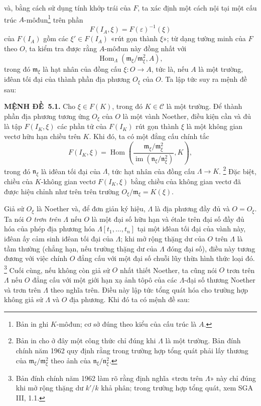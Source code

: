 \documentclass[11pt,twoside,openany]{book}
\numberwithin{equation}{section}
\newcommand{\src}[1]{%
  \phantomsection\hypertarget{src:\fgasourceid:#1}{}%
  \marginpar{\raggedleft\footnotesize\sffamily #1}%
}
\newcommand{\fgasourceid}{unset}
\newcommand{\result}[2]{\par\medskip\noindent\textbf{#1\if\relax\detokenize{#2}\relax\else\ #2\fi.}\quad}
\begin{document}
\src{376}
và, bằng cách sử dụng tính khớp trái của $F$, ta xác định một cách nội tại
một cấu trúc $A$-môđun\footnote{Bản in ghi $K$-môđun; cơ sở đúng theo kiểu
của cấu trúc là $A$.} trên phần
\[
  F(I_A,\xi)=F(\varepsilon)^{-1}(\xi)
\]
của $F(I_A)$ gồm các $\xi'\in F(I_A)$ «rút gọn thành $\xi$»; từ dạng tường
minh của $F$ theo $O$, ta kiểm tra được rằng $A$-môđun này đồng nhất với
\[
  \operatorname{Hom}_{\Lambda}(\mathfrak m_\xi/\mathfrak m_\xi^2,A),
\]
trong đó $\mathfrak m_\xi$ là hạt nhân của đồng cấu
$\xi:O\longrightarrow A$, tức là, nếu $A$ là một trường, iđêan tối đại của
thành phần địa phương $O_\xi$ của $O$. Ta lập tức suy ra mệnh đề sau:

\result{MỆNH ĐỀ}{5.1} Cho $\xi\in F(K)$, trong đó $K\in\mathcal C$ là một
trường. Để thành phần địa phương tương ứng $O_\xi$ của $O$ là một vành
Noether, điều kiện cần và đủ là tập $F(I_K,\xi)$ các phần tử của $F(I_K)$ rút
gọn thành $\xi$ là một không gian vectơ hữu hạn chiều trên $K$. Khi đó, ta có
một đẳng cấu chính tắc
\[
  F(I_K,\xi)=
  \operatorname{Hom}\!\left(
    \frac{\mathfrak m_\xi/\mathfrak m_\xi^2}
         {\operatorname{im}(\mathfrak n_\xi/\mathfrak n_\xi^2)},K
  \right),
\]
trong đó $\mathfrak n_\xi$ là iđêan tối đại của $\Lambda$, tức hạt nhân của
đồng cấu $\Lambda\longrightarrow K$.
\footnote{Bản in cho ở đây một công thức chỉ đúng khi $\Lambda$ là một
trường. Bản đính chính năm 1962 quy định rằng trong trường hợp tổng quát phải
lấy thương của $\mathfrak m_\xi/\mathfrak m_\xi^2$ theo ảnh của
$\mathfrak n_\xi/\mathfrak n_\xi^2$.}
Đặc biệt, chiều của $K$-không gian vectơ $F(I_K,\xi)$ bằng chiều của không
gian vectơ đã được hiệu chỉnh như trên trên trường
$O_\xi/\mathfrak m_\xi=K(\xi)$.

Giả sử $O_\xi$ là Noether và, để đơn giản ký hiệu, $\Lambda$ là địa phương
đầy đủ và $O=O_\xi$. Ta nói $O$ \emph{trơn trên $\Lambda$} nếu $O$ là một
đại số hữu hạn và étale trên đại số đầy đủ hóa của phép địa phương hóa
$\Lambda[t_1,\ldots,t_n]$ tại một iđêan tối đại của vành này, iđêan ấy cảm
sinh iđêan tối đại của $\Lambda$; khi mở rộng thặng dư của $O$ trên
$\Lambda$ là tầm thường (chẳng hạn, nếu trường thặng dư của $\Lambda$ đóng
đại số), điều này tương đương với việc chính $O$ đẳng cấu với một đại số
chuỗi lũy thừa hình thức loại đó.
\footnote{Bản đính chính năm 1962 làm rõ rằng định nghĩa «trơn trên
$\Lambda$» này chỉ đúng khi mở rộng thặng dư $k'/k$ khả phân; trong trường
hợp tổng quát, xem SGA III, 1.1.}
Cuối cùng, nếu không còn giả sử $O$ nhất thiết Noether, ta cũng nói $O$ trơn
trên $\Lambda$ nếu $O$ đẳng cấu với một giới hạn xạ ảnh tôpô của các
$\Lambda$-đại số thương Noether và trơn trên $\Lambda$ theo nghĩa trên. Điều
này lập tức tổng quát hóa cho trường hợp không giả sử $\Lambda$ và $O$ địa
phương. Khi đó ta có mệnh đề sau:
\end{document}
